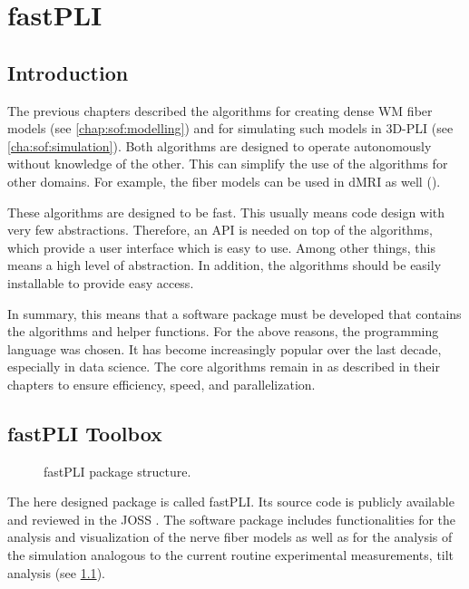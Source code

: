 \cleardoublepage
\setcounter{chapter}{6}
\chapter{\acs{fastPLI}}
\label{chap:Software}
% 
% 
% 
\section{Introduction}\label{sec:fastpliIntro}
%
The previous chapters described the algorithms for creating dense \ac{WM} fiber models (see \cref{chap:sof:modelling}) and for simulating such models in \ac{3D-PLI} (see \cref{cha:sof:simulation}).
Both algorithms are designed to operate autonomously without knowledge of the other.
This can simplify the use of the algorithms for other domains.
For example, the fiber models can be used in \ac{dMRI} as well (\cite{Ginsburger2019,ginsburgerDis2019}).

These algorithms are designed to be fast.
This usually means code design with very few abstractions.
Therefore, an \ac{API} is needed on top of the algorithms, which provide a user interface which is easy to use.
Among other things, this means a high level of abstraction.
In addition, the algorithms should be easily installable to provide easy access.
\par
%
In summary, this means that a software package must be developed that contains the algorithms and helper functions.
For the above reasons, the \python{} programming language was chosen.
It has become increasingly popular over the last decade, especially in data science.
The core algorithms remain in \cpp{} as described in their chapters to ensure efficiency, speed, and parallelization.
%
% 
% 
\section{fastPLI Toolbox}
%
\begin{figure}[!ht]
\centering
{}
\caption{\acs{fastPLI} package structure.}
\label{fig:fastpli}
\end{figure}
%
The here designed \python{} package is called  \ac{fastPLI}.
Its source code is publicly available and reviewed in the \ac{JOSS} \cite{fastpli,Matuschke2021}.
The software package includes functionalities for the analysis and visualization of the nerve fiber models as well as for the analysis of the simulation analogous to the current routine experimental measurements, \eg{} tilt analysis (see \cref{fig:fastpli}).
%
%
%

